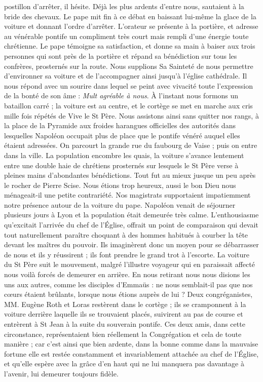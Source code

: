 postillon d'arrêter, il hésite. Déjà les plus ardents d'entre nous, sautaient à la bride des chevaux. Le pape mit fin à ce débat en baissant lui-même la glace de la voiture et donnant l'ordre d'arrêter. L'orateur se présente à la portière, et adresse au vénérable pontife un compliment très court mais rempli d'une énergie toute chrétienne. Le pape témoigne sa satisfaction, et donne sa main à baiser aux trois personnes qui sont près de la portière et répand sa bénédiction sur tous les confrères, prosternés sur la route. Nous supplions Sa Sainteté de nous permettre d'environner sa voiture et de l'accompagner ainsi jusqu'à l'église cathédrale. Il nous répond avec un sourire dans lequel se peint avec vivacité toute l'expression de la bonté de son âme : \textit{Mult agréable à nous}. À l'instant nous formons un bataillon carré ; la voiture est au centre, et le cortège se met en marche aux cris mille fois répétés de Vive le St Père. Nous assistons ainsi sans quitter nos rangs, à la place de la Pyramide aux froides harangues officielles des autorités dans lesquelles Napoléon occupait plus de place que le pontife vénéré auquel elles étaient adressées. On parcourt la grande rue du faubourg de Vaise ; puis on entre dans la ville. La population encombre les quais, la voiture s'avance lentement entre une double haie de chrétiens prosternés sur lesquels le St Père verse à pleines mains d'abondantes bénédictions. Tout fut au mieux jusque un peu après le rocher de Pierre Scise. Nous étions trop heureux, aussi le bon Dieu nous ménageait-il une petite contrariété. Nos magistrats supportaient impatiemment notre présence autour de la voiture du pape. Napoléon venait de séjourner plusieurs jours à Lyon et la population était demeurée très calme. L'enthousiasme qu'excitait l'arrivée du chef de l'Église, offrait un point de comparaison qui devait tout
naturellement paraître choquant à des hommes habitués à courber la tête devant les maîtres du pouvoir. Ils imaginèrent donc un moyen pour se débarrasser de nous et ils y réussirent ; ils font prendre le grand trot à l'escorte. La voiture du St Père suit le mouvement, malgré l'illustre voyageur qui en paraissait affecté nous voilà forcés de demeurer en arrière. En nous retirant nous nous disions les uns aux autres, comme les disciples d'Emmaüs : ne nous semblait-il pas que nos cœurs étaient brûlants, lorsque nous étions auprès de lui ? Deux congréganistes, MM. Eugène Roth et Loras restèrent dans le cortège ; ils se cramponnent à la voiture derrière laquelle ils se trouvaient placés, suivirent au pas de course et entrèrent à St Jean à la suite du souverain pontife. Ces deux amis, dans cette circonstance, représentaient bien réellement la Congrégation et cela de toute manière ; car c'est ainsi que bien ardente, dans la bonne comme dans la mauvaise fortune elle est restée constamment et invariablement attachée au chef de l'Église, et qu'elle espère avec la grâce d'en haut qui ne lui manquera pas davantage à l'avenir, lui demeurer toujours fidèle.

